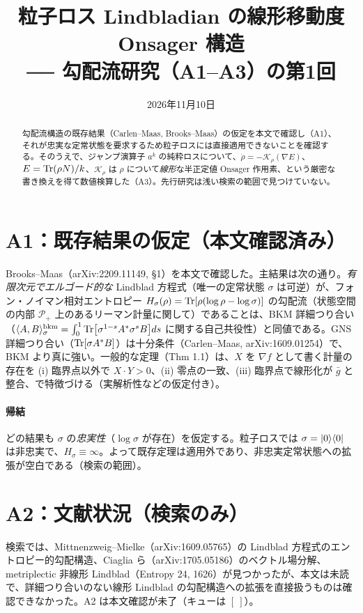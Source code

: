 \documentclass[11pt]{ltjsarticle}
\title{粒子ロス Lindbladian の線形移動度 Onsager 構造\\ ── 勾配流研究（A1--A3）の第1回}
\date{2026年11月10日}
\begin{document}
\maketitle
\begin{abstract}
勾配流構造の既存結果（Carlen--Maas, Brooks--Maas）の仮定を本文で確認し（A1）、それが忠実な定常状態を要求するため粒子ロスには直接適用できないことを確認する。そのうえで、ジャンプ演算子 $a^k$ の純粋ロスについて、$\dot\rho=-\mathcal K_\rho(\nabla E)$、$E=\Tr(\rho N)/k$、$\mathcal K_\rho$ は $\rho$ について\emph{線形}な半正定値 Onsager 作用素、という厳密な書き換えを得て数値検算した（A3）。先行研究は浅い検索の範囲で見つけていない。
\end{abstract}

\section{A1：既存結果の仮定（本文確認済み）}
Brooks--Maas（arXiv:2209.11149, §1）を本文で確認した。主結果は次の通り。\emph{有限次元でエルゴード的な} Lindblad 方程式（唯一の定常状態 $\sigma$ は可逆）が、フォン・ノイマン相対エントロピー $H_\sigma(\rho)=\Tr[\rho(\log\rho-\log\sigma)]$ の勾配流（状態空間の内部 $\mathcal P_+$ 上のあるリーマン計量に関して）であることは、BKM 詳細つり合い（$\langle A,B\rangle^{\rm bkm}_\sigma=\int_0^1\Tr[\sigma^{1-s}A^*\sigma^sB]ds$ に関する自己共役性）と同値である。GNS 詳細つり合い（$\Tr[\sigma A^*B]$）は十分条件（Carlen--Maas, arXiv:1609.01254）で、BKM より真に強い。一般的な定理（Thm 1.1）は、$X$ を $\nabla f$ として書く計量の存在を (i) 臨界点以外で $X\!\cdot\! Y>0$、(ii) 零点の一致、(iii) 臨界点で線形化が $\bar g$ と整合、で特徴づける（実解析性などの仮定付き）。

\paragraph{帰結}どの結果も $\sigma$ の\emph{忠実性}（$\log\sigma$ が存在）を仮定する。粒子ロスでは $\sigma=\ket0\!\bra0$ は非忠実で、$H_\sigma\equiv\infty$。よって既存定理は適用外であり、非忠実定常状態への拡張が空白である（検索の範囲）。

\section{A2：文献状況（検索のみ）}
検索では、Mittnenzweig--Mielke（arXiv:1609.05765）の Lindblad 方程式のエントロピー的勾配構造、Ciaglia ら（arXiv:1705.05186）のベクトル場分解、metriplectic 非線形 Lindblad（Entropy 24, 1626）が見つかったが、本文は未読で、詳細つり合いのない線形 Lindblad の勾配構造への拡張を直接扱うものは確認できなかった。A2 は本文確認が未了（キューは $[~]$）。
\end{document}
